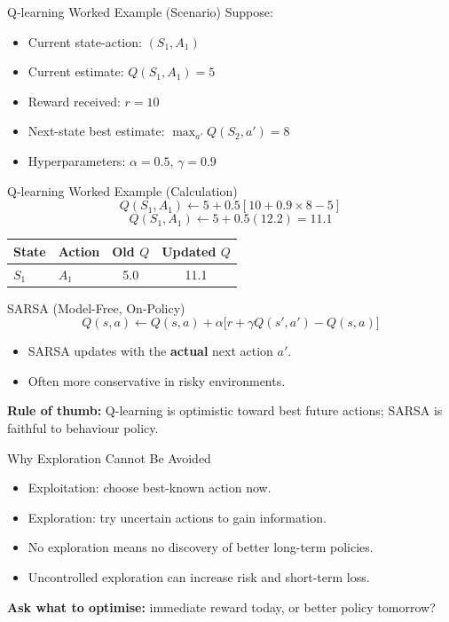 \documentclass[aspectratio=169]{beamer}
\newcommand{\defaultdeckrefs}{AIMA4e Ch.22 pp.789--822; Poole3e Ch.13 pp.583--608}
\newcommand{\currentsliderefs}{\defaultdeckrefs}
\newcommand{\setslideref}[1]{\gdef\currentsliderefs{#1}}
\begin{document}
\setslideref{AIMA4e Ch.22 pp.789--822; Poole3e Ch.13 pp.583--608}
\begin{frame}{Q-learning Worked Example (Scenario)}
Suppose:
\begin{itemize}
  \item Current state-action: $(S_1, A_1)$
  \item Current estimate: $Q(S_1,A_1)=5$
  \item Reward received: $r=10$
  \item Next-state best estimate: $\max_{a'}Q(S_2,a')=8$
  \item Hyperparameters: $\alpha=0.5$, $\gamma=0.9$
\end{itemize}
\end{frame}

\setslideref{AIMA4e Ch.22 pp.789--822; Poole3e Ch.13 pp.583--608}
\begin{frame}{Q-learning Worked Example (Calculation)}
\[
Q(S_1,A_1) \leftarrow 5 + 0.5\left[10 + 0.9\times 8 - 5\right]
\]
\[
Q(S_1,A_1) \leftarrow 5 + 0.5(12.2)=11.1
\]
\vspace{0.6em}
\begin{center}
\begin{tabular}{@{}l l c c@{}}
\toprule
State & Action & Old $Q$ & Updated $Q$ \\
\midrule
$S_1$ & $A_1$ & 5.0 & 11.1 \\
\bottomrule
\end{tabular}
\end{center}
\end{frame}

\setslideref{AIMA4e Ch.22 pp.789--822; Poole3e Ch.13 pp.583--608}
\begin{frame}{SARSA (Model-Free, On-Policy)}
\[
Q(s,a)\leftarrow Q(s,a) + \alpha\Big[r + \gamma Q(s',a') - Q(s,a)\Big]
\]
\begin{itemize}
  \item SARSA updates with the \textbf{actual} next action $a'$.
  \item Often more conservative in risky environments.
\end{itemize}
\vspace{0.4em}
\textbf{Rule of thumb:} Q-learning is optimistic toward best future actions; SARSA is faithful to behaviour policy.
\end{frame}

\setslideref{AIMA4e Ch.22 pp.789--822; Poole3e Ch.13 pp.583--608}
\begin{frame}{Why Exploration Cannot Be Avoided}
\begin{itemize}
  \item Exploitation: choose best-known action now.
  \item Exploration: try uncertain actions to gain information.
  \item No exploration means no discovery of better long-term policies.
  \item Uncontrolled exploration can increase risk and short-term loss.
\end{itemize}
\vspace{0.5em}
\textbf{Ask what to optimise:} immediate reward today, or better policy tomorrow?
\end{frame}
\end{document}
